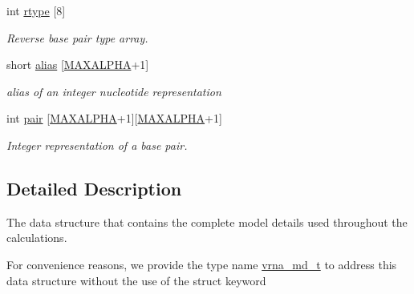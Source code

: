 \begin{DoxyCompactItemize}
int \mbox{\hyperlink{structvrna__md__s_ad082d0fea31e002b90cdfe5e6382f8b0}{rtype}} \mbox{[}8\mbox{]}
\begin{DoxyCompactList}\small\item\em Reverse base pair type array. \end{DoxyCompactList}\item 
\mbox{\label{structvrna__md__s_a66136cf9abc8ff790ec0d33245d68fd5}} 
short \mbox{\hyperlink{structvrna__md__s_a66136cf9abc8ff790ec0d33245d68fd5}{alias}} \mbox{[}\mbox{\hyperlink{group__model__details_ga05a5ffe718aa431d97419a12fb082379}{M\+A\+X\+A\+L\+P\+HA}}+1\mbox{]}
\begin{DoxyCompactList}\small\item\em alias of an integer nucleotide representation \end{DoxyCompactList}\item 
\mbox{\label{structvrna__md__s_ab4da594c638707e212f64aadb54a7454}} 
int \mbox{\hyperlink{structvrna__md__s_ab4da594c638707e212f64aadb54a7454}{pair}} \mbox{[}\mbox{\hyperlink{group__model__details_ga05a5ffe718aa431d97419a12fb082379}{M\+A\+X\+A\+L\+P\+HA}}+1\mbox{]}\mbox{[}\mbox{\hyperlink{group__model__details_ga05a5ffe718aa431d97419a12fb082379}{M\+A\+X\+A\+L\+P\+HA}}+1\mbox{]}
\begin{DoxyCompactList}\small\item\em Integer representation of a base pair. \end{DoxyCompactList}\end{DoxyCompactItemize}


\subsection{Detailed Description}
The data structure that contains the complete model details used throughout the calculations. 

For convenience reasons, we provide the type name \mbox{\hyperlink{group__model__details_ga1f8a10e12a0a1915f2a4eff0b28ea17c}{vrna\+\_\+md\+\_\+t}} to address this data structure without the use of the struct keyword

